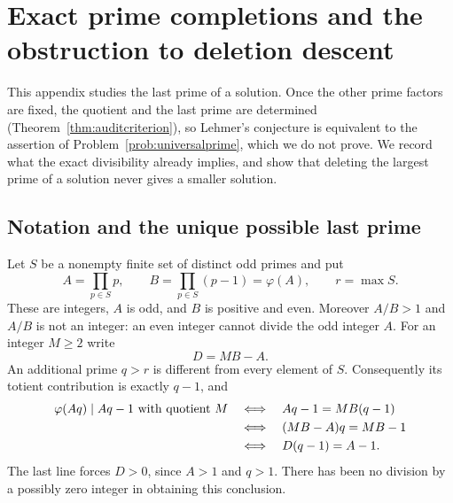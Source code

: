 \section{Exact prime completions and the obstruction to deletion descent}
\label{app:finalprimeaudit}

This appendix studies the last prime of a solution. Once the other
prime factors are fixed, the quotient and the last prime are
determined (Theorem~\ref{thm:auditcriterion}), so Lehmer's conjecture
is equivalent to the assertion of Problem~\ref{prob:universalprime},
which we do not prove. We record what the exact divisibility already
implies, and show that deleting the largest prime of a solution never
gives a smaller solution.

\subsection{Notation and the unique possible last prime}
Let $S$ be a nonempty finite set of distinct odd primes and put
\begin{equation}\label{eq:auditprefix}
 A=\prod_{p\in S}p,\qquad B=\prod_{p\in S}(p-1)=\varphi(A),
 \qquad r=\max S.
\end{equation}
These are integers, $A$ is odd, and $B$ is positive and even. Moreover
$A/B>1$ and $A/B$ is not an integer: an even integer cannot divide the
odd integer $A$. For an integer $M\ge2$ write
\begin{equation}\label{eq:auditdefect}
 D=MB-A.
\end{equation}
An additional prime $q>r$ is different from every element of $S$.
Consequently its totient contribution is exactly $q-1$, and
\begin{align}
 \varphi(Aq)\mid Aq-1\text{ with quotient }M
 &\quad\Longleftrightarrow\quad Aq-1=MB(q-1)\notag\\
 &\quad\Longleftrightarrow\quad (MB-A)q=MB-1\notag\\
 &\quad\Longleftrightarrow\quad D(q-1)=A-1.
 \label{eq:auditidentity}
\end{align}
The last line forces $D>0$, since $A>1$ and $q>1$.
There has been no division by a possibly zero integer in obtaining this
conclusion.


